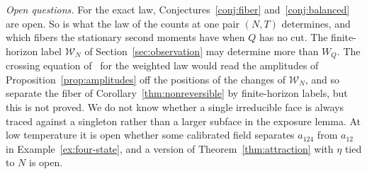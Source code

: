 \emph{Open questions.} For the exact law, Conjectures~\ref{conj:fiber} and~\ref{conj:balanced}
are open. So is what the law of the counts at one pair $(N,T)$ determines, and which fibers the
stationary second moments have when $Q$ has no cut. The finite-horizon label $\mathcal W_N$ of Section~\ref{sec:observation}
may determine more than $W_Q$. The crossing equation of~\cite[Theorem~5.8]{paperC1} for the
weighted law would read the amplitudes of Proposition~\ref{prop:amplitudes} off the positions of
the changes of $\mathcal W_N$, and so separate the fiber of Corollary~\ref{thm:nonreversible} by
finite-horizon labels, but this is not proved. We do not know whether a single irreducible face is
always traced against a singleton rather than a larger subface in the exposure lemma. At low
temperature it is open whether some calibrated field separates $a_{124}$ from $a_{12}$ in
Example~\ref{ex:four-state}, and a version of Theorem~\ref{thm:attraction} with $\eta$ tied to $N$
is open.
